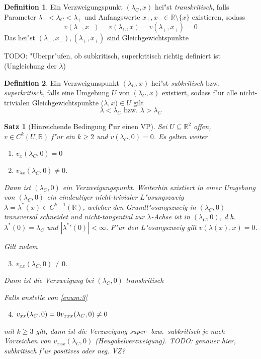 \documentclass[a4paper, 13pt]{scrreprt}
\newtheorem{satz}{Satz}[section]
\theoremstyle{definition} \newtheorem{definition}{Definition}[section]
\newcommand{\RR}{\mathbb{R}}
\begin{document}
\begin{definition}
Ein Verzweigungspunkt $(\lambda_C, x)$ hei"st \emph{transkritisch}, falls Parameter $\lambda_- < \lambda_C < \lambda_+$ und Anfangswerte $x_+, x_- \in \RR\setminus\{x\}$ existieren, sodass
$$ v(\lambda_-, x_-) = v(\lambda_C, x) = v(\lambda_+, x_+) = 0$$
Das hei"st $(\lambda_-, x_-), (\lambda_+, x_+)$ sind Gleichgewichtspunkte
\end{definition}

TODO: "Uberpr"ufen, ob subkritisch, superkritisch richtig definiert ist (Ungleichung der $\lambda$)
\begin{definition}
Ein Verzweigunspunkt $(\lambda_C, x)$ hei"st \emph{subkritisch} bzw. \emph{superkritisch}, falls eine Umgebung $U$ von $(\lambda_C, x)$ existiert, sodass f"ur alle nicht-trivialen Gleichgewichtspunkte ($\lambda, x) \in U$ gilt
$$ \lambda < \lambda_C \mbox{ bzw. } \lambda > \lambda_C$$
\end{definition}

\begin{satz}[Hinreichende Bedingung f"ur einen VP]
Sei $U\subseteq \RR^2$ offen, $v \in C^k(U, \RR)$ f"ur ein $k\geq 2$ und $v(\lambda_C,0)=0$. Es gelten weiter 
\begin{enumerate}
\item\label{enum:1}
$v_x(\lambda_C,0) = 0$

\item\label{enum:2}
$v_{\lambda x}(\lambda_C,0)\neq 0$.
\end{enumerate}
Dann ist $(\lambda_C,0)$ ein Verzweigungspunkt. Weiterhin existiert in einer Umgebung von $(\lambda_C,0)$ ein eindeutiger nicht-trivialer L"osungszweig $\lambda = \lambda^*(x) \in C^{k-1}(\RR)$, welcher den Grundl"osungszweig in $(\lambda_C,0)$ \emph{transversal} schneidet und nicht-tangential zur $\lambda$-Achse ist in $(\lambda_C,0)$, d.h.\ $\lambda^*(0) = \lambda_C$ und $|{\lambda^*}'(0)| < \infty$. F"ur den L"osungszweig gilt $v(\lambda(x), x) = 0$.

Gilt zudem
\begin{enumerate}
\setcounter{enumi}{2}
\item\label{enum:3}
$v_{xx}(\lambda_C,0)\neq 0$.
\end{enumerate}
Dann ist die Verzweigung bei $(\lambda_C,0)$ transkritisch

Falls anstelle von \ref{enum:3}
\begin{enumerate}
\setcounter{enumi}{3}
\item\label{enum:4}
\(
v_{xx}(\lambda_C,0) = 0\\
v_{xxx}(\lambda_C,0)\neq 0
\)
\end{enumerate}
mit $k\geq3$ gilt, dann ist die Verzweigung \emph{super- } bzw.\ \emph{subkritisch} je nach Vorzeichen von $v_{xxx}(\lambda_C,0)$ (\emph{Heugabelverzweigung}). TODO: genauer hier, subkritisch f"ur positives oder neg. VZ?
\end{satz}
\end{document}
